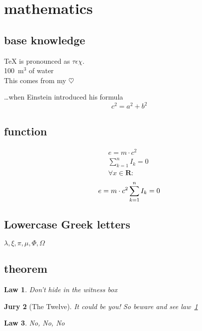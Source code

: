 \documentclass[10pt,a4paper]{article}
\begin{document}
\section{mathematics}
\subsection{base knowledge}
\TeX{} is pronounced as
$\tau\epsilon\chi$.\\[6pt]
100~m$^{3}$ of water\\[6pt]
This comes from my $\heartsuit$

\ldots when Einstein introduced his formula
\begin{displaymath}
c^{2}=a^{2}+b^{2}
\end{displaymath}


\subsection{function}
\begin{eqnarray}
e = m \cdot c^2 \; \\
\sum_{k=1}^{n} I_k = 0 \; \\
\forall x \in \mathbf{R}:
\end{eqnarray}
\begin{equation}
e = m \cdot c^2 \; \\
\sum_{k=1}^{n} I_k = 0 \; \\
\end{equation}


\subsection{Lowercase Greek letters}
$\lambda,\xi,\pi,\mu,\Phi,\Omega$


\subsection*{theorem}
\newtheorem{law}{Law}
\newtheorem{jury}[law]{Jury}
\begin{law} \label{law:box}
Don't hide in the witness box
\end{law}
\begin{jury}[The Twelve]
It could be you! So beware and
see law~\ref{law:box}\end{jury}
\begin{law}No, No, No\end{law}
\end{document}
